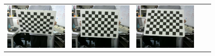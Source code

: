 \documentclass[]{jarticle}          %
\begin{document}
\begin{figure}[!ht]
\begin{center}
\begin{tabular}{ccccc}
      \includegraphics[keepaspectratio, scale=0.1]{figures/carib/camera1/6.png}&
      \includegraphics[keepaspectratio, scale=0.1]{figures/carib/camera1/7.png}&
      \includegraphics[keepaspectratio, scale=0.1]{figures/carib/camera1/8.png}&

\end{tabular}
\end{center}
\end{figure}
\end{document}
